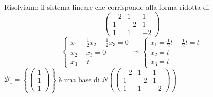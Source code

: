 \documentclass[a4paper]{article}
\theoremstyle{break}
\theoremstyle{break}
\theoremstyle{break}
\theoremstyle{break}
\begin{document}
\begin{example}
\begin{enumerate}
      \noindent Risolviamo il sistema lineare che corrisponde alla forma ridotta di
      \[ \begin{pmatrix} 
        -2 & 1 & 1\\
        1 & -2 & 1\\
        1 & 1 & -2
      \end{pmatrix}  \]
      \[
      \begin{cases}
        x_1 - \frac{1}{2}x_2 - \frac{1}{2}x_3 = 0\\
        x_2 - x_3 = 0\\
        x_3 = t
      \end{cases}
      \leadsto
      \begin{cases}
        x_1 = \frac{1}{2}t + \frac{1}{2}t = t\\
        x_2 = t\\
        x_3 = t
      \end{cases}
      \] 
      \( \mathcal{B}_1 = \left\{ \begin{pmatrix} 1\\1\\1 \end{pmatrix}  \right\}  \) è una base di
      \( N \left( \begin{pmatrix} 
        -2 & 1 & 1\\
        1 & -2 & 1\\
        1 & 1 & -2
      \end{pmatrix}  \right)  \)


\end{enumerate}
\end{example}
\end{document}
